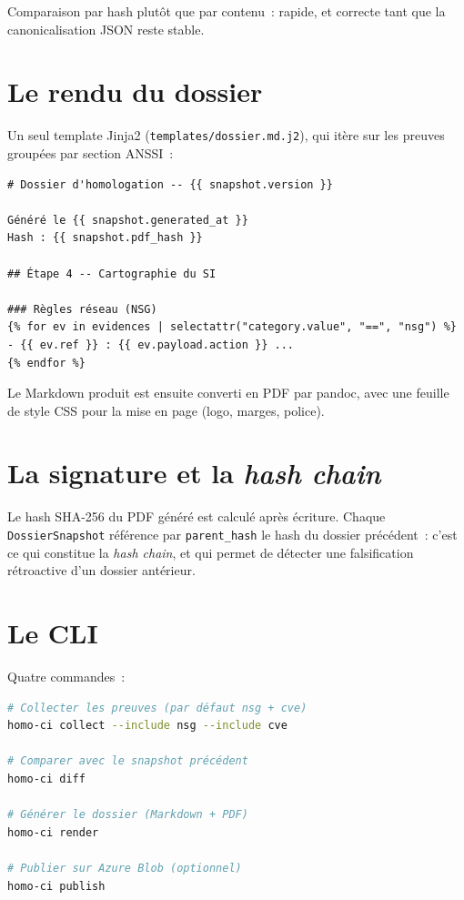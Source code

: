 Comparaison par hash plutôt que par contenu~: rapide, et
correcte tant que la canonicalisation JSON reste stable.

\section{Le rendu du dossier}

Un seul template Jinja2 (\texttt{templates/dossier.md.j2}), qui
itère sur les preuves groupées par section ANSSI~:

\begin{lstlisting}[language={[LaTeX]TeX},caption={Extrait du
template.}]
# Dossier d'homologation -- {{ snapshot.version }}

Généré le {{ snapshot.generated_at }}
Hash : {{ snapshot.pdf_hash }}

## Étape 4 -- Cartographie du SI

### Règles réseau (NSG)
{% for ev in evidences | selectattr("category.value", "==", "nsg") %}
- {{ ev.ref }} : {{ ev.payload.action }} ...
{% endfor %}
\end{lstlisting}

Le Markdown produit est ensuite converti en PDF par pandoc, avec
une feuille de style CSS pour la mise en page (logo, marges,
police).

\section{La signature et la \emph{hash chain}}

Le hash SHA-256 du PDF généré est calculé après écriture. Chaque
\texttt{DossierSnapshot} référence par \texttt{parent\_hash} le
hash du dossier précédent~: c'est ce qui constitue la \emph{hash
chain}, et qui permet de détecter une falsification rétroactive
d'un dossier antérieur.

\section{Le CLI}

Quatre commandes~:

\begin{lstlisting}[language=bash]
# Collecter les preuves (par défaut nsg + cve)
homo-ci collect --include nsg --include cve

# Comparer avec le snapshot précédent
homo-ci diff

# Générer le dossier (Markdown + PDF)
homo-ci render

# Publier sur Azure Blob (optionnel)
homo-ci publish
\end{lstlisting}

